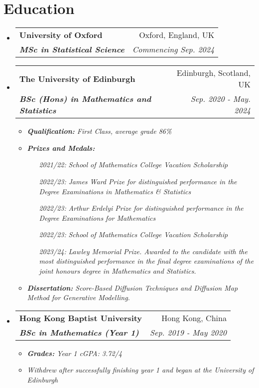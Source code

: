 \documentclass[12pt, a4paper]{article}
\makeatletter
\newcommand{\resumeSection}[1]{
    \section*{#1}
}
\newcommand{\resumeSectionItm}[4]{
\item
    \begin{tabular*}{0.96\textwidth}{@{}l@{\extracolsep{\fill}}r@{}}
        \textbf{#1} & #2 \\
        \textit{\textbf{#3}} & \textit{#4}
    \end{tabular*}
}
\makeatother
\begin{document}
\resumeSection{Education}
\begin{itemize}[leftmargin=*]
    \resumeSectionItm
	{University of Oxford}{Oxford, England, UK}
    {MSc in Statistical Science}{Commencing Sep. 2024}
\end{itemize}
\begin{itemize}[leftmargin=*]
    \resumeSectionItm
    {The University of Edinburgh}{Edinburgh, Scotland, UK}
    {BSc (Hons) in Mathematics and Statistics}{Sep. 2020 - May. 2024}
    \begin{itemize}[leftmargin=*]
        \vspace{-1mm}
        \item \it{\textbf{Qualification:} First Class, average grade 86\%}
        \item \it{\textbf{Prizes and Medals:}}
            \begin{itemize}[
                align=left,
                leftmargin=4em,
                itemindent=0.5pt,
                labelsep=0pt,
                labelwidth=4em
                ]
                \item [\it{2021/22:}]
                    \it{School of Mathematics College Vacation Scholarship}
                \item [\it{2022/23:}]
                    \it{James Ward Prize for distinguished performance in the
                        Degree Examinations in Mathematics \& Statistics}
                \item [\it{2022/23:}]
                    \it{Arthur Erdelyi Prize for distinguished
                    performance in the Degree Examinations for Mathematics}
                \item [\it{2022/23:}]
                    \it{School of Mathematics College Vacation Scholarship}
                \item [\it{2023/24:}]
                    \it{Lawley Memorial Prize. Awarded to the candidate with the most distinguished performance in the final degree examinations of the joint honours degree in Mathematics and Statistics.}
            \end{itemize}
        \item \it{\textbf{Dissertation:} Score-Based Diffusion Techniques and Diffusion Map Method for Generative Modelling.}
    \end{itemize}
\end{itemize}
\vspace{-5.5mm}
\begin{itemize}[leftmargin=*]
    \resumeSectionItm
    {Hong Kong Baptist University}{Hong Kong, China}
    {BSc in Mathematics (Year 1)}{Sep. 2019 - May 2020}
    \vspace{-1.5mm}
    \begin{itemize}[leftmargin=*]
        \item \it{\textbf{Grades:}}
            \textit{Year 1 cGPA: 3.72/4}
        \footnotesize \item \textit{\footnotesize Withdrew after successfully
            finishing year 1 and began at the University of Edinburgh}
    \end{itemize}
\end{itemize}
\end{document}
